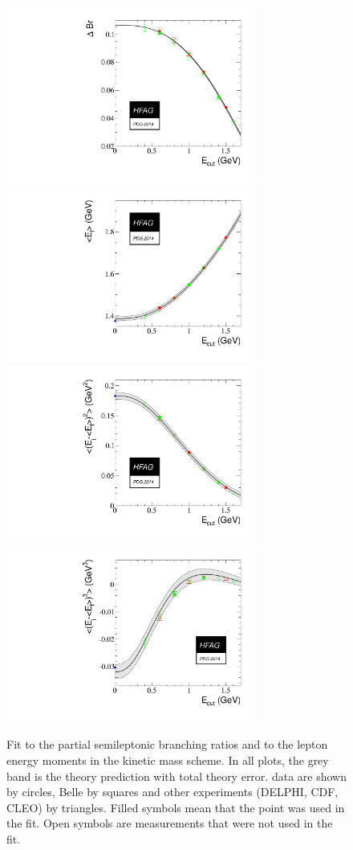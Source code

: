 \begin{figure}
\begin{center}
  \includegraphics[width=8.2cm]{figures/slb/e0_1.pdf}
  \includegraphics[width=8.2cm]{figures/slb/e1_1.pdf}\\
  \includegraphics[width=8.2cm]{figures/slb/e2_1.pdf}
  \includegraphics[width=8.2cm]{figures/slb/e3_1.pdf}
\end{center}
\caption{Fit to the partial semileptonic branching ratios and to the
  lepton energy moments in the kinetic mass scheme. In all plots, the
  grey band is the theory prediction with total theory error. \babar
  data are shown by circles, Belle by squares and other experiments
  (DELPHI, CDF, CLEO) by triangles. Filled symbols mean that the point
  was used in the fit. Open symbols are measurements that were not
  used in the fit.} \label{fig:gf_res_kin_el}
\end{figure}
